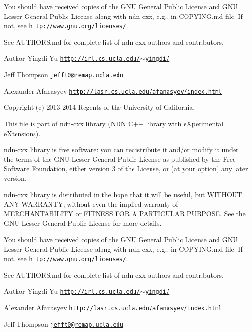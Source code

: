 You should have received copies of the G\+NU General Public License and G\+NU Lesser General Public License along with ndn-\/cxx, e.\+g., in C\+O\+P\+Y\+I\+N\+G.\+md file. If not, see \href{http://www.gnu.org/licenses/}{\tt http\+://www.\+gnu.\+org/licenses/}.

See A\+U\+T\+H\+O\+R\+S.\+md for complete list of ndn-\/cxx authors and contributors.

\begin{DoxyAuthor}{Author}
Yingdi Yu \href{http://irl.cs.ucla.edu/~yingdi/}{\tt http\+://irl.\+cs.\+ucla.\+edu/$\sim$yingdi/} 

Jeff Thompson \href{mailto:jefft0@remap.ucla.edu}{\tt jefft0@remap.\+ucla.\+edu} 

Alexander Afanasyev \href{http://lasr.cs.ucla.edu/afanasyev/index.html}{\tt http\+://lasr.\+cs.\+ucla.\+edu/afanasyev/index.\+html}
\end{DoxyAuthor}
Copyright (c) 2013-\/2014 Regents of the University of California.

This file is part of ndn-\/cxx library (N\+DN C++ library with e\+Xperimental e\+Xtensions).

ndn-\/cxx library is free software\+: you can redistribute it and/or modify it under the terms of the G\+NU Lesser General Public License as published by the Free Software Foundation, either version 3 of the License, or (at your option) any later version.

ndn-\/cxx library is distributed in the hope that it will be useful, but W\+I\+T\+H\+O\+UT A\+NY W\+A\+R\+R\+A\+N\+TY; without even the implied warranty of M\+E\+R\+C\+H\+A\+N\+T\+A\+B\+I\+L\+I\+TY or F\+I\+T\+N\+E\+SS F\+OR A P\+A\+R\+T\+I\+C\+U\+L\+AR P\+U\+R\+P\+O\+SE. See the G\+NU Lesser General Public License for more details.

You should have received copies of the G\+NU General Public License and G\+NU Lesser General Public License along with ndn-\/cxx, e.\+g., in C\+O\+P\+Y\+I\+N\+G.\+md file. If not, see \href{http://www.gnu.org/licenses/}{\tt http\+://www.\+gnu.\+org/licenses/}.

See A\+U\+T\+H\+O\+R\+S.\+md for complete list of ndn-\/cxx authors and contributors.

\begin{DoxyAuthor}{Author}
Yingdi Yu \href{http://irl.cs.ucla.edu/~yingdi/}{\tt http\+://irl.\+cs.\+ucla.\+edu/$\sim$yingdi/} 

Alexander Afanasyev \href{http://lasr.cs.ucla.edu/afanasyev/index.html}{\tt http\+://lasr.\+cs.\+ucla.\+edu/afanasyev/index.\+html} 

Jeff Thompson \href{mailto:jefft0@remap.ucla.edu}{\tt jefft0@remap.\+ucla.\+edu} 
\end{DoxyAuthor}

